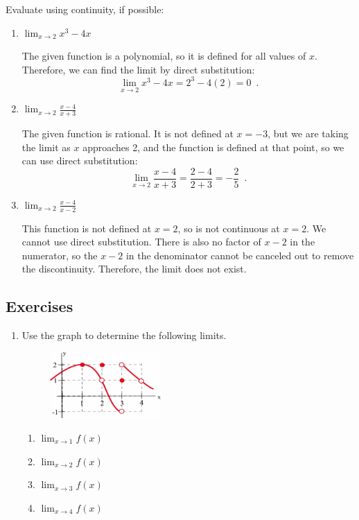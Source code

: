 \begin{example}
Evaluate using continuity, if possible:
    \begin{enumerate}[label=(\alph*)]
    \item $\displaystyle\lim_{x\to 2}x^3-4x$

    \begin{solution} The given function is a polynomial, so it is defined for all values of $x$. Therefore, we can find the limit by direct substitution:
    $$\lim_{x\to 2}x^3-4x = 2^3-4(2) = 0 \enspace.$$
    \end{solution}
    \item $\displaystyle\lim_{x\to 2}\frac{x-4}{x+3}$

    \begin{solution} 
    The given function is rational. It is not defined at $x = -3$, but we are taking the limit as $x$ approaches 2, and the function is defined at that point, so we can use direct substitution:
    $$\lim_{x\to 2}\frac{x-4}{x+3} = \frac{2-4}{2+3}=-\frac{2}{5} \enspace .$$
    \end{solution}
    \item $\displaystyle\lim_{x\to 2} \frac{x-4}{x-2}$

    \begin{solution} 
    This function is not defined at $x = 2$, so is not continuous at $x = 2$. We cannot use direct substitution. There is also no factor of $x-2$ in the numerator, so the $x-2$ in the denominator cannot be canceled out to remove the discontinuity. Therefore, the limit does not exist.
    \end{solution}
\end{enumerate}

\subsection{Exercises}

\begin{enumerate}
    \item Use the graph to determine the following limits.
    \begin{figure}[!ht]
    \centering
    \includegraphics[width=0.4\textwidth]{img/chap2/image016.png}
    \end{figure}
    \begin{enumerate}[label=(\alph*)]
    \item $\displaystyle\lim_{x\to 1} f(x)$
    \item $\displaystyle\lim_{x\to 2} f(x)$
    \item $\displaystyle\lim_{x\to 3} f(x)$
    \item $\displaystyle\lim_{x\to 4} f(x)$
    \end{enumerate}


\end{enumerate}
\end{example}
